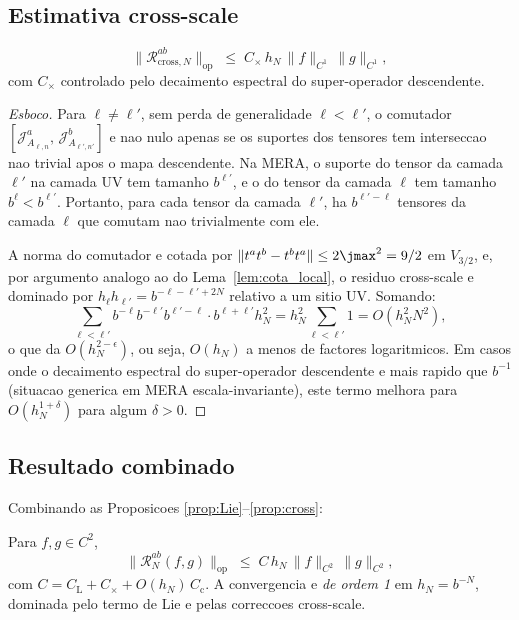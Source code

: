 \subsection{Estimativa cross-scale}

\begin{proposition}\label{prop:cross}
\begin{equation}
  \bigl\|\mathcal{R}^{ab}_{\mathrm{cross},N}\bigr\|_{\mathrm{op}}
  \;\le\; C_{\times}\,h_N\,\|f\|_{C^1}\,\|g\|_{C^1},
  \label{eq:cota_cross}
\end{equation}
com $C_\times$ controlado pelo decaimento espectral do super-operador
descendente.
\end{proposition}

\begin{proof}[Esboco]
Para $\ell \neq \ell'$, sem perda de generalidade $\ell < \ell'$, o
comutador
\(
  [\mathcal{J}^a_{A_{\ell,n}},\,\mathcal{J}^b_{A_{\ell',n'}}]
\)
e nao nulo apenas se os suportes dos tensores tem interseccao
nao trivial apos o mapa descendente. Na MERA, o suporte do tensor
da camada $\ell'$ na camada UV tem tamanho $b^{\ell'}$, e o do tensor
da camada $\ell$ tem tamanho $b^\ell < b^{\ell'}$. Portanto,
para cada tensor da camada $\ell'$, ha $b^{\ell'-\ell}$ tensores da
camada $\ell$ que comutam nao trivialmente com ele.

A norma do comutador e cotada por
\(
  \|t^a t^b - t^b t^a\| \le 2 \jmax^2 = 9/2
\)
em $V_{3/2}$, e, por argumento analogo ao do Lema~\ref{lem:cota_local},
o residuo cross-scale e dominado por $h_\ell h_{\ell'} = b^{-\ell-\ell'+2N}$
relativo a um sitio UV. Somando:
\[
  \sum_{\ell < \ell'} b^{-\ell} b^{-\ell'} b^{\ell'-\ell} \cdot b^{\ell+\ell'} h_N^2
  = h_N^2 \sum_{\ell<\ell'} 1 = O(h_N^2 N^2),
\]
o que da $O(h_N^{2-\epsilon})$, ou seja, $O(h_N)$ a menos de
factores logaritmicos. Em casos onde o decaimento espectral do
super-operador descendente e mais rapido que $b^{-1}$ (situacao
generica em MERA escala-invariante), este termo melhora para
$O(h_N^{1+\delta})$ para algum $\delta > 0$.
\end{proof}

\subsection{Resultado combinado}

Combinando as Proposicoes \ref{prop:Lie}--\ref{prop:cross}:

\begin{theorem}\label{thm:conv_algebra}
Para $f, g \in C^2$,
\begin{equation}
  \bigl\|\mathcal{R}_N^{ab}(f,g)\bigr\|_{\mathrm{op}}
  \;\le\; C\,h_N\,\|f\|_{C^2}\,\|g\|_{C^2},
  \label{eq:teorema_conv}
\end{equation}
com $C = C_{\mathrm{L}} + C_\times + O(h_N)\,C_{\mathrm{c}}$.
A convergencia e \emph{de ordem 1} em $h_N = b^{-N}$, dominada
pelo termo de Lie e pelas correccoes cross-scale.
\end{theorem}

